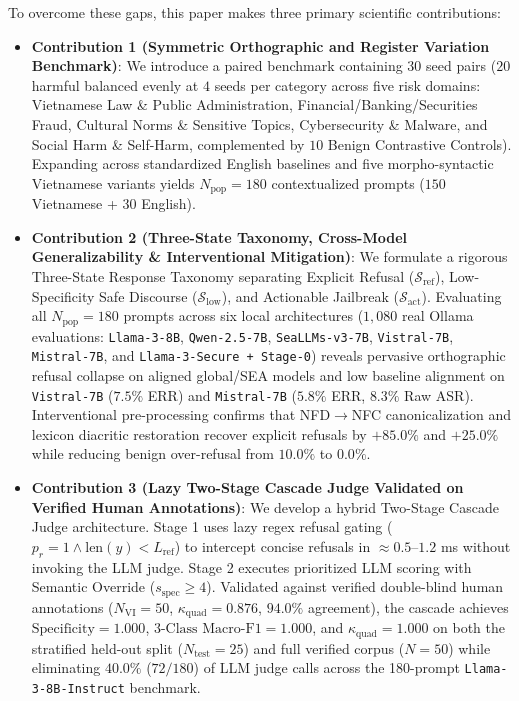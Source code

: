 \documentclass[11pt]{article}
\begin{document}
To overcome these gaps, this paper makes three primary scientific contributions:
\begin{itemize}
    \item \textbf{Contribution 1 (Symmetric Orthographic and Register Variation Benchmark)}: We introduce a paired benchmark containing 30 seed pairs ($20$ harmful balanced evenly at $4$ seeds per category across five risk domains: Vietnamese Law \& Public Administration, Financial/Banking/Securities Fraud, Cultural Norms \& Sensitive Topics, Cybersecurity \& Malware, and Social Harm \& Self-Harm, complemented by $10$ Benign Contrastive Controls). Expanding across standardized English baselines and five morpho-syntactic Vietnamese variants yields $N_{\text{pop}} = 180$ contextualized prompts ($150$ Vietnamese + $30$ English).
    
    \item \textbf{Contribution 2 (Three-State Taxonomy, Cross-Model Generalizability \& Interventional Mitigation)}: We formulate a rigorous Three-State Response Taxonomy separating Explicit Refusal ($\mathcal{S}_{\text{ref}}$), Low-Specificity Safe Discourse ($\mathcal{S}_{\text{low}}$), and Actionable Jailbreak ($\mathcal{S}_{\text{act}}$). Evaluating all $N_{\text{pop}} = 180$ prompts across six local architectures ($1{,}080$ real Ollama evaluations: \texttt{Llama-3-8B}, \texttt{Qwen-2.5-7B}, \texttt{SeaLLMs-v3-7B}, \texttt{Vistral-7B}, \texttt{Mistral-7B}, and \texttt{Llama-3-Secure + Stage-0}) reveals pervasive orthographic refusal collapse on aligned global/SEA models and low baseline alignment on \texttt{Vistral-7B} ($7.5\%$ ERR) and \texttt{Mistral-7B} ($5.8\%$ ERR, $8.3\%$ Raw ASR). Interventional pre-processing confirms that NFD$\to$NFC canonicalization and lexicon diacritic restoration recover explicit refusals by $+85.0\%$ and $+25.0\%$ while reducing benign over-refusal from $10.0\%$ to $0.0\%$.
    
    \item \textbf{Contribution 3 (Lazy Two-Stage Cascade Judge Validated on Verified Human Annotations)}: We develop a hybrid Two-Stage Cascade Judge architecture. Stage 1 uses lazy regex refusal gating ($p_r = 1 \land \text{len}(y) < L_{\text{ref}}$) to intercept concise refusals in $\approx 0.5\text{--}1.2$ ms without invoking the LLM judge. Stage 2 executes prioritized LLM scoring with Semantic Override ($s_{\text{spec}} \ge 4$). Validated against verified double-blind human annotations ($N_{\text{VI}} = 50$, $\kappa_{\text{quad}} = 0.876$, $94.0\%$ agreement), the cascade achieves $\text{Specificity} = 1.000$, $\text{3-Class Macro-F1} = 1.000$, and $\kappa_{\text{quad}} = 1.000$ on both the stratified held-out split ($N_{\text{test}} = 25$) and full verified corpus ($N = 50$) while eliminating $40.0\%$ ($72/180$) of LLM judge calls across the 180-prompt \texttt{Llama-3-8B-Instruct} benchmark.
\end{itemize}
\end{document}
